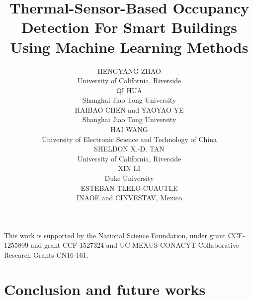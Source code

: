 \documentclass[acmtodaes,notfinal]{acmtrans2m}
\title{Thermal-Sensor-Based Occupancy Detection For Smart Buildings Using Machine Learning Methods}
\author{ \small
HENGYANG ZHAO\\
University of California, Riverside\\
QI HUA \\
Shanghai Jiao Tong University\\
HAIBAO CHEN and YAOYAO YE\\
Shanghai Jiao Tong University\\
HAI WANG \\
University of Electronic Science and Technology of China\\
SHELDON X.-D. TAN \\
University of California, Riverside\\
XIN LI\\
Duke University\\
ESTEBAN TLELO-CUAUTLE \\
INAOE and CINVESTAV, Mexico
}
\let\orgsetcounter\setcounter
\begin{document}
{\let\setcounter\orgsetcounter
\begin{bottomstuff}
\newline \indent
This work is supported by the National Science Foundation, under
  grant CCF-1255899 and grant CCF-1527324 and UC MEXUS-CONACYT
  Collaborative Research Grants CN16-161.

\end{bottomstuff}
}

\maketitle











%
%
%
%

\section{Conclusion and future works}
\label{sec:conclution}
\end{document}
